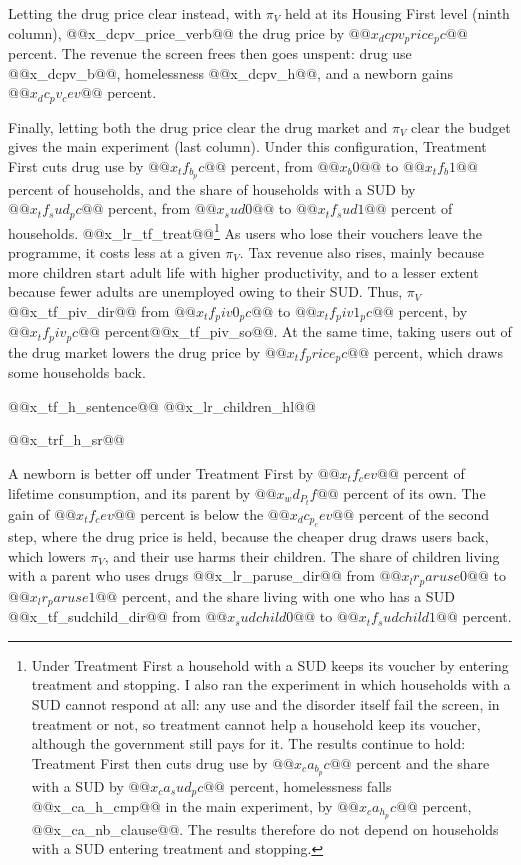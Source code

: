 \documentclass[10pt]{article}
\begin{document}
Letting the drug price clear instead, with $\pi_V$ held at its Housing First level (ninth column), @@x_dcpv_price_verb@@ the drug price by $@@x_dcpv_price_pc@@$ percent. The revenue the screen frees then goes unspent: drug use @@x_dcpv_b@@, homelessness @@x_dcpv_h@@, and a newborn gains $@@x_dc_pv_cev@@$ percent.

Finally, letting both the drug price clear the drug market and $\pi_V$ clear the budget gives the main experiment (last column). Under this configuration, Treatment First cuts drug use by $@@x_tf_b_pc@@$ percent,
from $@@x_b0@@$ to $@@x_tf_b1@@$ percent of households, and the share of households with
a SUD by $@@x_tf_sud_pc@@$ percent, from $@@x_sud0@@$ to $@@x_tf_sud1@@$ percent of
households. @@x_lr_tf_treat@@\footnote{Under Treatment First a household with a SUD keeps its voucher by entering treatment and stopping. I also ran the experiment in which households with a SUD cannot respond at all: any use and the disorder itself fail the screen, in treatment or not, so treatment cannot help a household keep its voucher, although the government still pays for it. The results continue to hold: Treatment First then cuts drug use by $@@x_ca_b_pc@@$ percent and the share with a SUD by $@@x_ca_sud_pc@@$ percent, homelessness falls @@x_ca_h_cmp@@ in the main experiment, by $@@x_ca_h_pc@@$ percent, @@x_ca_nb_clause@@. The results therefore do not depend on households with a SUD entering treatment and stopping.} As users who lose their vouchers leave the programme, it costs
less at a given $\pi_V$. Tax revenue also rises, mainly because more children start adult life with higher productivity, and to a lesser extent because fewer adults are unemployed owing to their SUD. Thus, $\pi_V$ @@x_tf_piv_dir@@ from $@@x_tf_piv0_pc@@$ to
$@@x_tf_piv1_pc@@$ percent, by $@@x_tf_piv_pc@@$ percent@@x_tf_piv_so@@. At the same time, taking users out of the drug market lowers the drug price by
$@@x_tf_price_pc@@$ percent, which draws some households back.

@@x_tf_h_sentence@@ @@x_lr_children_hl@@

@@x_trf_h_sr@@

A newborn is better off under Treatment First by $@@x_tf_cev@@$ percent of lifetime consumption, and its parent by $@@x_wd_P_tf@@$ percent of its own. The gain of $@@x_tf_cev@@$ percent is below the $@@x_dc_p_cev@@$ percent of the second step, where the drug price is held, because the cheaper drug draws users back, which lowers $\pi_V$, and their use harms their children. The share of children living with a parent who uses drugs @@x_lr_paruse_dir@@ from $@@x_lr_paruse0@@$ to $@@x_lr_paruse1@@$ percent, and the share living with one who has a SUD @@x_tf_sudchild_dir@@ from $@@x_sudchild0@@$ to $@@x_tf_sudchild1@@$ percent.
\end{document}
